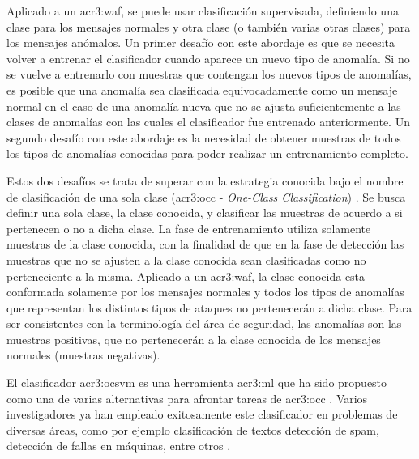 Aplicado a un \gls{acr3:waf}, se puede usar clasificación supervisada,
definiendo una clase para los mensajes normales y otra clase (o también
varias otras clases) para los mensajes anómalos.
Un primer desafío con este abordaje es que se necesita volver a entrenar
el clasificador cuando aparece un nuevo tipo de anomalía. Si no se vuelve
a entrenarlo con muestras que contengan los nuevos tipos de anomalías, es
posible que una anomalía sea clasificada equivocadamente como un mensaje
normal en el caso de una anomalía nueva que no se ajusta suficientemente
a las clases de anomalías con las cuales el clasificador fue entrenado
anteriormente.
Un segundo desafío con este abordaje es la necesidad de obtener muestras
de todos los tipos de anomalías conocidas para poder realizar un
entrenamiento completo.

Estos dos desafíos se trata de superar con la estrategia conocida bajo
el nombre de clasificación de una sola clase (\gls{acr3:occ} -
\textit{One-Class Classification})
\cite{khan2009survey}. %
Se busca definir una sola clase, la clase conocida, y clasificar las
muestras de acuerdo a si pertenecen o no a dicha clase. La fase de
entrenamiento utiliza solamente muestras de la clase conocida, con la
finalidad de que en la fase de detección las muestras que no se ajusten
a la clase conocida sean clasificadas como no perteneciente a la misma.
Aplicado a un \gls{acr3:waf}, la clase conocida esta conformada solamente
por los mensajes normales y todos los tipos de anomalías que representan
los distintos tipos de ataques no pertenecerán a dicha clase. Para ser
consistentes con la terminología del área de seguridad, las anomalías
son las muestras positivas, que no pertenecerán a la clase conocida
de los mensajes normales (muestras negativas).

El clasificador \gls{acr3:ocsvm} es una herramienta \gls{acr3:ml} que
ha sido propuesto como una de varias alternativas para afrontar tareas
de \gls{acr3:occ} \cite{scholkopf2001estimating}.
Varios investigadores ya han empleado exitosamente este clasificador
en problemas de diversas áreas, como por ejemplo clasificación de textos
detección de spam, detección de fallas en máquinas, entre otros
\cite{khan2014one}. %

